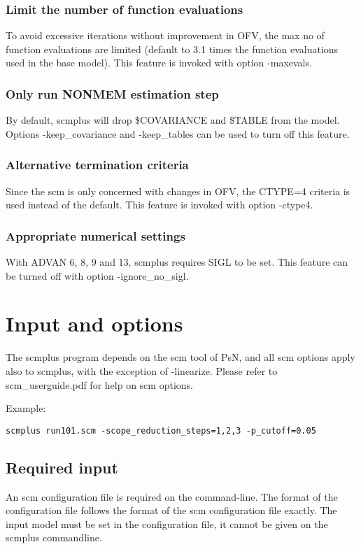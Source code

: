 \documentclass[hideglossary,notoc,hidelof,hidelot,hideTheSignaturePage,hideLinkCurrent,hideloa,pdfLatex,noClient,notitle,hideConfidential]{PMXstyle-20190820}
\newcommand{\maxevals}{3.1\xspace}
\begin{document}
\subsubsection{Limit the number of function evaluations}
To avoid excessive
iterations without improvement in OFV, the max no of function
evaluations are limited (default to \maxevals times the function evaluations
used in the base model). This feature is invoked with option -maxevals.
\subsubsection{Only run NONMEM estimation step}
By default, scmplus will drop \$COVARIANCE and \$TABLE from the model.
Options -keep\_covariance and -keep\_tables can be used to turn off this feature.
\subsubsection{Alternative termination criteria}
Since the scm is only concerned with
changes in OFV, the CTYPE=4 criteria is used instead of the default.
This feature is invoked with option -ctype4.
\subsubsection{Appropriate numerical settings}
With ADVAN 6, 8, 9 and 13, scmplus requires SIGL to be set.
This feature can be turned off with option -ignore\_no\_sigl.


\section{Input and options}

The scmplus program depends on the scm tool of PsN, and all scm options apply also to scmplus,
with the exception of -linearize.
Please refer to scm\_userguide.pdf for help on scm options.

Example:
\begin{verbatim}
scmplus run101.scm -scope_reduction_steps=1,2,3 -p_cutoff=0.05
\end{verbatim}

\subsection{Required input}
An scm configuration file is required on the command-line. The format of the configuration file follows the format of 
the scm configuration file exactly. 
The input model must be set in the configuration file, it cannot be given on the scmplus commandline. 
\end{document}

